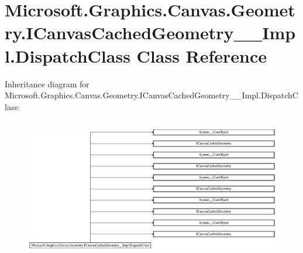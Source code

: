 \hypertarget{class_microsoft_1_1_graphics_1_1_canvas_1_1_geometry_1_1_i_canvas_cached_geometry_____impl_1_1_dispatch_class}{}\section{Microsoft.\+Graphics.\+Canvas.\+Geometry.\+I\+Canvas\+Cached\+Geometry\+\_\+\+\_\+\+Impl.\+Dispatch\+Class Class Reference}
\label{class_microsoft_1_1_graphics_1_1_canvas_1_1_geometry_1_1_i_canvas_cached_geometry_____impl_1_1_dispatch_class}
Inheritance diagram for Microsoft.\+Graphics.\+Canvas.\+Geometry.\+I\+Canvas\+Cached\+Geometry\+\_\+\+\_\+\+Impl.\+Dispatch\+Class\+:\begin{figure}[H]
\begin{center}
\leavevmode
\includegraphics[height=6.147705cm]{class_microsoft_1_1_graphics_1_1_canvas_1_1_geometry_1_1_i_canvas_cached_geometry_____impl_1_1_dispatch_class}
\end{center}
\end{figure}
